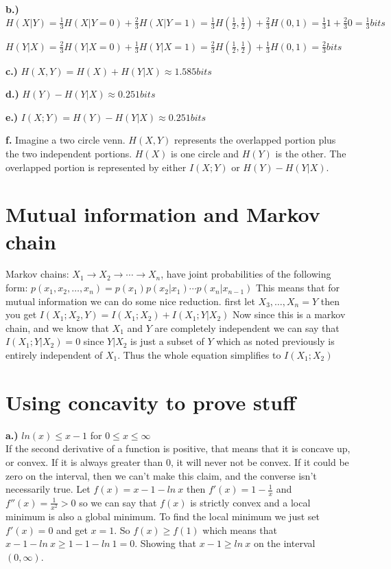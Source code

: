 \documentclass[10pt]{article}
\begin{document}
\begin{tiny}
\begin{multicols}{3}
            {\bf b.)}
              \(
                H(X|Y) = \frac{1}{3}H(X|Y=0) + \frac{2}{3}H(X|Y=1)
                =\frac{1}{3}H(\frac{1}{2},\frac {1}{2})+\frac{2}{3}H(0,1)
                =\frac{1}{3}1+\frac{2}{3}0 
                = \frac{1}{3} bits \) 
                
                \(
                H(Y|X) = \frac{2}{3}H(Y|X=0)+\frac{1}{3}H(Y|X=1)
                =\frac{2}{3}H(\frac{1}{2},\frac{1}{2}) + \frac{1}{3}H(0,1)
                =\frac{2}{3} bits
              \)
              
            {\bf c.)}
           	 \(
            		H(X,Y)=H(X)+H(Y|X)
			\approx 1.585 bits
          	  \)
          	  
            {\bf d.)} \(H(Y) - H(Y|X) \approx 0.251 bits\)
            	
            {\bf e.)} \( I(X;Y) =H(Y) - H(Y|X) \approx 0.251 bits
		\)
		
            {\bf f.}  Imagine a two circle venn. $H(X,Y)$ represents the overlapped portion plus the two independent portions. $H(X)$ is one circle and $H(Y)$ is the other. The overlapped portion is represented by either $I(X;Y)$ or $H(Y)-H(Y|X)$.
          
\section*{Mutual information and Markov chain} Markov chains: $X_{1}\rightarrow X_{2}\rightarrow \cdots \rightarrow X_{n}$, 
        		have joint probabilities of the following form: 
		\(
			p(x_{1},x_{2},\ldots,x_{n})=p(x_{1})p(x_{2}|x_{1})\cdots p(x_{n}|x_{n-1})
		\)
		This means that for mutual information we can do some nice reduction.
		first let \( X_{3},\ldots,X_{n} = Y\) then you get \(
			I(X_{1};X_{2},Y) = I(X_{1};X_{2})+I(X_{1};Y|X_{2})  \)
		Now since this is a markov chain, and we know that $X_{1}$ and $Y$ are completely independent
		we can say that $I(X_{1};Y|X_{2})=0$ since $Y|X_{2}$ is just a subset of $Y$ which as noted
		previously is entirely independent of $X_{1}$. Thus the whole equation simplifies to $I(X_{1};X_{2})$

\section*{Using concavity to prove stuff}
			{\bf a.)} $ln(x) \leq x-1$ for $0\leq x \leq \infty$\\
				If the second derivative of a function is positive, that means that it is concave up, or convex. If it is always greater than 0, it will never not be convex. If it could be zero on the interval, then we can't make this claim, and the converse isn't necessarily true.
				Let \(f(x)=x-1-ln\ x \) then 
				\(
				 f'(x)= 1-\frac{1}{x}\) and \(
				 f''(x)=\frac{1}{x^2} > 0
				\)
				 so we can say that $f(x)$ is strictly convex and a local minimum is also a global minimum. To find the local minimum we just set $f'(x)=0$ and get $x=1$. So $f(x) \geq f(1)$ which means that $x-1-ln\ x \geq 1-1-ln\ 1 = 0$. Showing that $x-1 \geq ln\ x$ on the interval $(0,\infty)$.
				 

\end{multicols}
\end{tiny}
\end{document}
